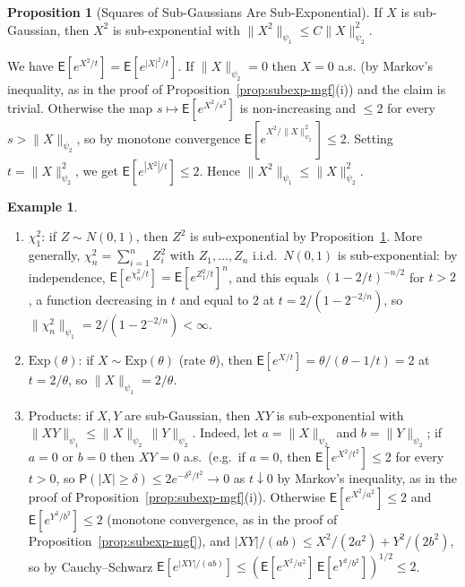 \documentclass[12pt,a4paper]{article}
\makeatletter
\theoremstyle{definition}
\newtheorem{example}[theorem]{Example}
\newtheorem{proposition}[theorem]{Proposition}
\renewenvironment{proof}[1][\proofname]{\par
  \pushQED{\qed}%
  \normalfont \topsep6\p@\@plus6\p@\relax
  \trivlist
  \item[\hskip\labelsep\bfseries #1\@addpunct{.}]\ignorespaces
}{%
  \popQED\endtrivlist\@endpefalse
}
\newcommand\expc{\mathsf{E}}
\newcommand\prb{\mathsf{P}}
\makeatother
\begin{document}
\begin{proposition}[Squares of Sub-Gaussians Are Sub-Exponential]\label{prop:sg-square}
If $X$ is sub-Gaussian, then $X^2$ is sub-exponential with $\|X^2\|_{\psi_1} \leqslant C\|X\|_{\psi_2}^2$.
\end{proposition}

\begin{proof}
We have $\expc[e^{X^2/t}] = \expc[e^{|X|^2/t}]$. If $\|X\|_{\psi_2} = 0$ then $X = 0$ a.s. (by Markov's inequality, as in the proof of Proposition~\ref{prop:subexp-mgf}(i)) and the claim is trivial. Otherwise the map $s \mapsto \expc[e^{X^2/s^2}]$ is non-increasing and $\leqslant 2$ for every $s > \|X\|_{\psi_2}$, so by monotone convergence $\expc[e^{X^2/\|X\|_{\psi_2}^2}] \leqslant 2$. Setting $t = \|X\|_{\psi_2}^2$, we get $\expc[e^{|X^2|/t}] \leqslant 2$. Hence $\|X^2\|_{\psi_1} \leqslant \|X\|_{\psi_2}^2$.
\end{proof}

\begin{example}\label{ex:subexp}
\leavevmode
\begin{enumerate}[label=\textup{(\arabic*)}]
\item $\chi^2_1$: if $Z \sim N(0,1)$, then $Z^2$ is sub-exponential by Proposition~\ref{prop:sg-square}. More generally, $\chi^2_n = \sum_{i=1}^n Z_i^2$ with $Z_1,\dots,Z_n$ i.i.d.\ $N(0,1)$ is sub-exponential: by independence, $\expc[e^{\chi^2_n/t}] = \expc[e^{Z_1^2/t}]^n$, and this equals $(1 - 2/t)^{-n/2}$ for $t > 2$, a function decreasing in $t$ and equal to $2$ at $t = 2/(1 - 2^{-2/n})$, so $\|\chi^2_n\|_{\psi_1} = 2/(1 - 2^{-2/n}) < \infty$.
\item $\mathrm{Exp}(\theta)$: if $X \sim \mathrm{Exp}(\theta)$ (rate $\theta$), then $\expc[e^{X/t}] = \theta/(\theta - 1/t) = 2$ at $t = 2/\theta$, so $\|X\|_{\psi_1} = 2/\theta$.
\item Products: if $X, Y$ are sub-Gaussian, then $XY$ is sub-exponential with $\|XY\|_{\psi_1} \leqslant \|X\|_{\psi_2}\,\|Y\|_{\psi_2}$. Indeed, let $a = \|X\|_{\psi_2}$ and $b = \|Y\|_{\psi_2}$; if $a = 0$ or $b = 0$ then $XY = 0$ a.s.\ (e.g.\ if $a = 0$, then $\expc[e^{X^2/t^2}] \leqslant 2$ for every $t > 0$, so $\prb(|X| \geqslant \delta) \leqslant 2e^{-\delta^2/t^2} \to 0$ as $t \downarrow 0$ by Markov's inequality, as in the proof of Proposition~\ref{prop:subexp-mgf}(i)). Otherwise $\expc[e^{X^2/a^2}] \leqslant 2$ and $\expc[e^{Y^2/b^2}] \leqslant 2$ (monotone convergence, as in the proof of Proposition~\ref{prop:subexp-mgf}), and $|XY|/(ab) \leqslant X^2/(2a^2) + Y^2/(2b^2)$, so by Cauchy--Schwarz $\expc[e^{|XY|/(ab)}] \leqslant (\expc[e^{X^2/a^2}]\,\expc[e^{Y^2/b^2}])^{1/2} \leqslant 2$.
\end{enumerate}
\end{example}
\end{document}
